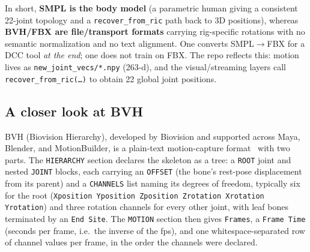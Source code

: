 \documentclass[10pt,twocolumn]{article}
\newcommand{\code}[1]{\texttt{\small #1}}
\begin{document}
In short, \textbf{SMPL is the body model} (a parametric human giving a consistent 22-joint
topology and a \code{recover\_from\_ric} path back to 3D positions), whereas \textbf{BVH/FBX are
file/transport formats} carrying rig-specific rotations with no semantic normalization and no text
alignment. One converts SMPL$\rightarrow$FBX for a DCC tool \emph{at the end}; one does not train
on FBX. The repo reflects this: motion lives as \code{new\_joint\_vecs/*.npy} (263-d), and the
visual/streaming layers call \code{recover\_from\_ric(\dots)} to obtain 22 global joint positions.

\subsection{A closer look at BVH}
BVH (Biovision Hierarchy), developed by Biovision and supported across Maya, Blender, and
MotionBuilder, is a plain-text motion-capture format~\cite{bvh} with two parts. The
\code{HIERARCHY} section declares the skeleton as a tree: a \code{ROOT} joint and nested
\code{JOINT} blocks, each carrying an \code{OFFSET} (the bone's rest-pose displacement from its
parent) and a \code{CHANNELS} list naming its degrees of freedom, typically six for the root
(\code{Xposition Yposition Zposition Zrotation Xrotation Yrotation}) and three rotation channels for
every other joint, with leaf bones terminated by an \code{End Site}. The \code{MOTION} section
then gives \code{Frames}, a \code{Frame Time} (seconds per frame, i.e.\ the inverse of the fps), and
one whitespace-separated row of channel values per frame, in the order the channels were declared.
\end{document}
